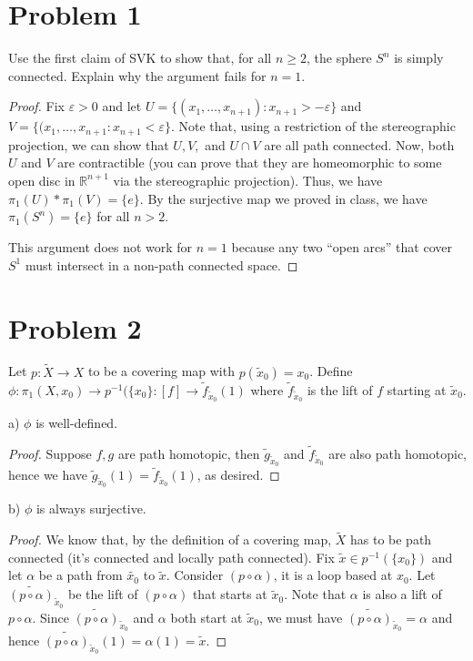 \documentclass[11pt]{article} %
\newcommand{\R}{\mathbb{R}}
\newcommand{\wt}{\widetilde}
\begin{document}
\section*{Problem 1}
Use the first claim of SVK to show that, for all $n\geq 2$, the sphere $S^n$ is simply connected. Explain why the argument fails for $n=1$.

\begin{proof}
Fix $\varepsilon>0$ and let $U = \{(x_1,\ldots,x_{n+1}):x_{n+1}>-\varepsilon\}$ and $V = \{(x_1,\ldots,x_{n+1}:x_{n+1}<\varepsilon\}$. Note that, using a restriction of the stereographic projection, we can show that $U,V,$ and $U\cap V$ are all path connected. Now, both $U$ and $V$ are contractible (you can prove that they are homeomorphic to some open disc in $\R^{n+1}$ via the stereographic projection). Thus, we have $\pi_1(U)*\pi_1(V) = \{e\}$. By the surjective map we proved in class, we have $\pi_1(S^n) = \{e\}$ for all $n>2$. 

This argument does not work for $n=1$ because any two ``open arcs'' that cover $S^1$ must intersect in a non-path connected space.
\end{proof}

\section*{Problem 2}
Let $p:\wt{X}\to X$ to be a covering map with $p(\wt{x}_0) = x_0$. Define $\phi:\pi_1(X,x_0)\to p^{-1}(\{x_0\}:[f]\to \wt{f}_{\wt{x}_0}(1)$ where $\wt{f}_{\wt{x}_0}$ is the lift of $f$ starting at $\wt{x}_0$.

a) $\phi$ is well-defined.

\begin{proof}
Suppose $f,g$ are path homotopic, then $\wt{g}_{\wt{x}_0}$ and $\wt{f}_{\wt{x}_0}$ are also path homotopic, hence we have $\wt{g}_{\wt{x}_0}(1)=\wt{f}_{\wt{x}_0}(1)$, as desired.
\end{proof}

b) $\phi$ is always surjective.

\begin{proof}
We know that, by the definition of a covering map, $\wt{X}$ has to be path connected (it's connected and locally path connected). Fix $\wt{x}\in p^{-1}(\{x_0\})$ and let $\alpha$ be a path from $\wt{x_0}$ to $\wt{x}$. Consider $(p\circ\alpha)$, it is a loop based at $x_0$. Let $\wt{(p\circ \alpha)}_{\wt{x}_0}$ be the lift of $(p\circ \alpha)$ that starts at $\wt{x}_0$. Note that $\alpha$ is also a lift of $p\circ \alpha$. Since $\wt{(p\circ \alpha)}_{\wt{x}_0}$ and $\alpha$ both start at $\wt{x}_0$, we must have $\wt{(p\circ \alpha)}_{\wt{x}_0} = \alpha$ and hence $\wt{(p\circ \alpha)}_{\wt{x}_0}(1) = \alpha(1) = \wt{x}$.
\end{proof}
\end{document}
